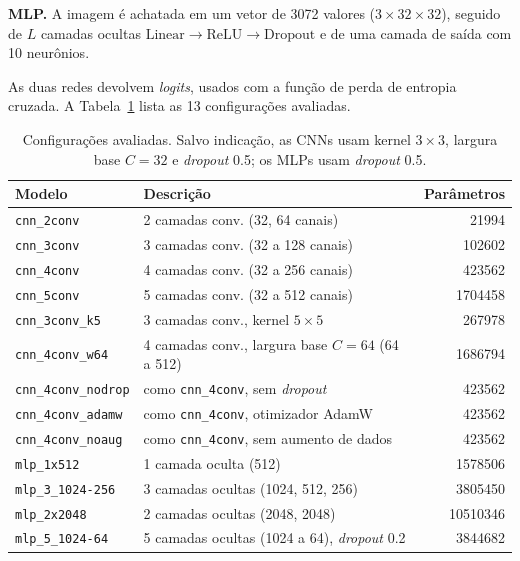 \documentclass[11pt,a4paper]{article}
\newcommand{\code}[1]{\texttt{#1}}
\begin{document}
\textbf{MLP.} A imagem é achatada em um vetor de \num{3072} valores ($3\times32\times32$), seguido de $L$ camadas ocultas $\text{Linear} \to \text{ReLU} \to \text{Dropout}$ e de uma camada de saída com 10 neurônios.

As duas redes devolvem \textit{logits}, usados com a função de perda de entropia cruzada. A Tabela~\ref{tab:configs} lista as 13 configurações avaliadas.

\begin{table}[H]
\centering
\caption{Configurações avaliadas. Salvo indicação, as CNNs usam kernel $3\times3$, largura base $C=32$ e \textit{dropout} \num{0,5}; os MLPs usam \textit{dropout} \num{0,5}.}
\label{tab:configs}
\small
\begin{tabular}{llr}
\toprule
Modelo & Descrição & Parâmetros \\
\midrule
\code{cnn\_2conv}        & 2 camadas conv. (32, 64 canais)                 & \num{21994} \\
\code{cnn\_3conv}        & 3 camadas conv. (32 a 128 canais)               & \num{102602} \\
\code{cnn\_4conv}        & 4 camadas conv. (32 a 256 canais)               & \num{423562} \\
\code{cnn\_5conv}        & 5 camadas conv. (32 a 512 canais)               & \num{1704458} \\
\code{cnn\_3conv\_k5}    & 3 camadas conv., kernel $5\times5$              & \num{267978} \\
\code{cnn\_4conv\_w64}   & 4 camadas conv., largura base $C=64$ (64 a 512) & \num{1686794} \\
\code{cnn\_4conv\_nodrop}& como \code{cnn\_4conv}, sem \textit{dropout}    & \num{423562} \\
\code{cnn\_4conv\_adamw} & como \code{cnn\_4conv}, otimizador AdamW        & \num{423562} \\
\code{cnn\_4conv\_noaug} & como \code{cnn\_4conv}, sem aumento de dados    & \num{423562} \\
\midrule
\code{mlp\_1x512}        & 1 camada oculta (512)                           & \num{1578506} \\
\code{mlp\_3\_1024-256}  & 3 camadas ocultas (\num{1024}, 512, 256)        & \num{3805450} \\
\code{mlp\_2x2048}       & 2 camadas ocultas (\num{2048}, \num{2048})      & \num{10510346} \\
\code{mlp\_5\_1024-64}   & 5 camadas ocultas (\num{1024} a 64), \textit{dropout} \num{0,2} & \num{3844682} \\
\bottomrule
\end{tabular}
\end{table}
\end{document}
